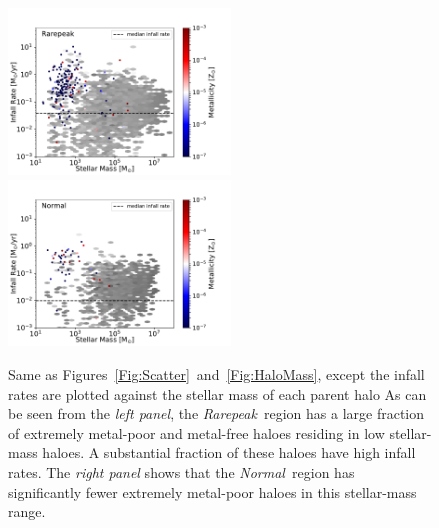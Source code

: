 \documentclass[graphics, twocolumn, usenatbib]{mn2e}
\newcommand{\rarepeak} {\textit{Rarepeak~}}
\newcommand{\normal} {\textit{Normal~}}
\begin{document}
\begin{figure}
\centering
\begin{minipage}{175mm}      \begin{center} 
\centerline{
\includegraphics[width=0.525\textwidth]{FIGURES/Rarepeak_MdotMstellarZ_Hexbin.pdf}
\includegraphics[width=0.525\textwidth]{FIGURES/Normal_MdotMstellarZ_Hexbin.pdf}}
\caption{Same as Figures~\ref{Fig:Scatter}~and~\ref{Fig:HaloMass}, except
the infall rates are plotted against  the stellar mass of each parent halo 
 As can be seen from the \textit{left panel}, the \rarepeak region has a large fraction of
  extremely metal-poor and metal-free haloes residing in low stellar-mass haloes. A substantial
  fraction of these haloes have high infall rates. 
  The \textit{right panel} shows that the \normal region has significantly fewer extremely metal-poor haloes in this stellar-mass range.}
\label{Fig:StellarMass}
\end{center} \end{minipage}

\end{figure}
\end{document}

